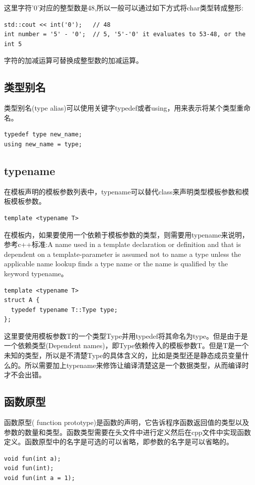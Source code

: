 \documentclass[12pt]{book}
\begin{document}
这里字符'0'对应的整型数是48,所以一般可以通过如下方式将char类型转成整形:
\begin{lstlisting}
std::cout << int('0');   // 48
int number = '5' - '0';  // 5, '5'-'0' it evaluates to 53-48, or the int 5
\end{lstlisting}
字符的加减运算可替换成整型数的加减运算。

\subsection{类型别名}
类型别名(type alias)可以使用关键字typedef或者using，用来表示将某个类型重命名。
\begin{lstlisting}
typedef type new_name;
using new_name = type;
\end{lstlisting}

\subsection{typename}
在模板声明的模板参数列表中，typename可以替代class来声明类型模板参数和模板模板参数。
\begin{lstlisting}
template <typename T>
\end{lstlisting}
在模板内，如果要使用一个依赖于模板参数的类型，则需要用typename来说明，参考c++标准:A name used in a template declaration or definition and that is dependent on a template-parameter is assumed not to name a type unless the applicable name lookup finds a type name or the name is qualified by the keyword typename。
\begin{lstlisting}
template <typename T>
struct A {
  typedef typename T::Type type;
};
\end{lstlisting}
这里要使用模板参数T的一个类型Type并用typedef将其命名为type。但是由于是一个依赖类型(Dependent names)，即Type依赖传入的模板参数T。但是T是一个未知的类型，所以是不清楚Type的具体含义的，比如是类型还是静态成员变量什么的。所以需要加上typename来修饰让编译清楚这是一个数据类型，从而编译时才不会出错。

\subsection{函数原型}
函数原型( function prototype)是函数的声明，它告诉程序函数返回值的类型以及参数的数量和类型。函数类型需要在头文件中进行定义然后在cpp文件中实现函数定义。函数原型中的名字是可选的可以省略，即参数的名字是可以省略的。
\begin{lstlisting}
void fun(int a);
void fun(int);
void fun(int a = 1);
\end{lstlisting}
\end{document}
